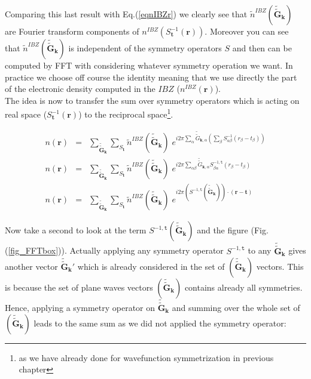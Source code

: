 \documentclass[a4paper,12pt]{report}
\begin{document}
Comparing this last result with Eq.(\ref{eqnIBZr}) we clearly see that $\tilde{n}^{IBZ}(\tilde{\tilde{\mathbf{G}}}_{\mathbf{k}})$ are Fourier transform components of $n^{IBZ}\left(S_{\mathbf{t}}^{-1}(\mathbf{r})\right)$. Moreover you can see that $\tilde{n}^{IBZ}(\tilde{\tilde{\mathbf{G}}}_{\mathbf{k}})$ is independent of the symmetry operators $S$ and then can be computed by FFT with considering whatever symmetry operation we want. In practice we choose off course the identity meaning that we use directly the part of the electronic density computed in the $IBZ$ ($n^{IBZ}(\mathbf{r})$).\\
The idea is now to transfer the sum over symmetry operators which is acting on real space ($S_{\mathbf{t}}^{-1}(\mathbf{r})$) to the reciprocal space\footnote{as we have already done for wavefunction symmetrization in previous chapter}.

\begin{eqnarray}
n(\mathbf{r}) &=& \sum_{\tilde{\tilde{\mathbf{G}}}_{\mathbf{k}}} \sum_{S_{\mathbf{t}}} \tilde{n}^{IBZ}(\tilde{\tilde{\mathbf{G}}}_{\mathbf{k}})\; e^{i2\pi \sum_{\alpha} \tilde{\tilde{G}}_{\mathbf{k},\alpha} \left( \sum_{\beta} S^{-1}_{\alpha\beta} (r_{\beta}-t_{\beta})\right) } \nonumber \\
n(\mathbf{r}) &=& \sum_{\tilde{\tilde{\mathbf{G}}}_{\mathbf{k}}} \sum_{S_{\mathbf{t}}} \tilde{n}^{IBZ}(\tilde{\tilde{\mathbf{G}}}_{\mathbf{k}})\; e^{i2\pi \sum_{\alpha\beta} \tilde{\tilde{G}}_{\mathbf{k},\alpha} S^{-1,{\mathtt{t}}}_{\beta\alpha} (r_{\beta}-t_{\beta}) } \nonumber \\
n(\mathbf{r}) &=& \sum_{\tilde{\tilde{\mathbf{G}}}_{\mathbf{k}}} \sum_{S_{\mathbf{t}}} \tilde{n}^{IBZ}(\tilde{\tilde{\mathbf{G}}}_{\mathbf{k}})\; e^{i2\pi \left( S^{-1,{\mathtt{t}}} (\tilde{\tilde{\mathbf{G}}}_{\mathbf{k}}) \right) \cdot (\mathbf{r}-\mathbf{t}) }
\end{eqnarray}

Now take a second to look at the term $S^{-1,{\mathtt{t}}} (\tilde{\tilde{\mathbf{G}}}_{\mathbf{k}})$ and the figure (Fig.(\ref{fig_FFTbox})). Actually applying any symmetry operator $S^{-1,{\mathtt{t}}}$ to any $\tilde{\tilde{\mathbf{G}}}_{\mathbf{k}}$ gives another vector $\tilde{\tilde{\mathbf{G}}}_{\mathbf{k}}'$ which is already considered in the set of $(\tilde{\tilde{\mathbf{G}}}_{\mathbf{k}})$ vectors. This is because the set of plane waves vectors $(\tilde{\tilde{\mathbf{G}}}_{\mathbf{k}})$ contains already all symmetries. Hence, applying a symmetry operator on $\tilde{\tilde{\mathbf{G}}}_{\mathbf{k}}$ and summing over the whole set of $(\tilde{\tilde{\mathbf{G}}}_{\mathbf{k}})$ leads to the same sum as we did not applied the symmetry operator:
\end{document}

